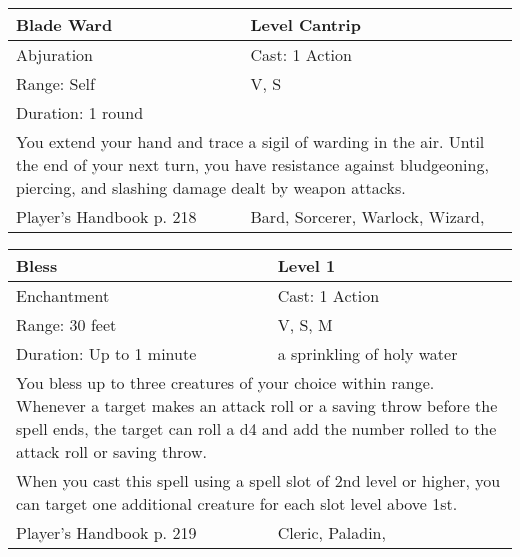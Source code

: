 \documentclass[11pt]{report}
\begin{document}
\begin{table}[H]
	\begin{tabular}{||p{6cm}|p{6cm}||}
		\hline\hline
		\bf{Blade Ward} & Level Cantrip\\ \hline
		Abjuration & Cast: 1 Action\\ \hline
		Range: Self & V, S\\ \hline
		Duration: 1 round & \\ \hline
		\multicolumn{2}{||p{12cm}||}{You extend your hand and trace a sigil of warding in the air. Until the end of your next turn, you have resistance against bludgeoning, piercing, and slashing damage dealt by weapon attacks.}\\ \hline
Player's Handbook p. 218 & Bard, Sorcerer, Warlock, Wizard, \\ \hline\hline
	\end{tabular}
\end{table}

\begin{table}[H]
	\begin{tabular}{||p{6cm}|p{6cm}||}
		\hline\hline
		\bf{Bless} & Level 1\\ \hline
		Enchantment & Cast: 1 Action\\ \hline
		Range: 30 feet & V, S, M\\ \hline
		Duration: Up to 1 minute & a sprinkling of holy water\\ \hline
		\multicolumn{2}{||p{12cm}||}{You bless up to three creatures of your choice within range. Whenever a target makes an attack roll or a saving throw before the spell ends, the target can roll a d4 and add the number rolled to the attack roll or saving throw.}\\ \hline
		\multicolumn{2}{||p{12cm}||}{When you cast this spell using a spell slot of 2nd level or higher, you can target one additional creature for each slot level above 1st.}\\ \hline
Player's Handbook p. 219 & Cleric, Paladin, \\ \hline\hline
	\end{tabular}
\end{table}
\end{document}
